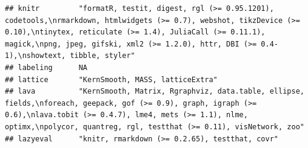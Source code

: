 \documentclass[]{article}
\begin{document}
\begin{verbatim}
## knitr         "formatR, testit, digest, rgl (>= 0.95.1201), codetools,\nrmarkdown, htmlwidgets (>= 0.7), webshot, tikzDevice (>= 0.10),\ntinytex, reticulate (>= 1.4), JuliaCall (>= 0.11.1), magick,\npng, jpeg, gifski, xml2 (>= 1.2.0), httr, DBI (>= 0.4-1),\nshowtext, tibble, styler"                                                                                                                                                                                                                                                                                                             
## labeling      NA                                                                                                                                                                                                                                                                                                                                                                                                                                                                                                                                                                                        
## lattice       "KernSmooth, MASS, latticeExtra"                                                                                                                                                                                                                                                                                                                                                                                                                                                                                                                                                          
## lava          "KernSmooth, Matrix, Rgraphviz, data.table, ellipse, fields,\nforeach, geepack, gof (>= 0.9), graph, igraph (>= 0.6),\nlava.tobit (>= 0.4.7), lme4, mets (>= 1.1), nlme, optimx,\npolycor, quantreg, rgl, testthat (>= 0.11), visNetwork, zoo"                                                                                                                                                                                                                                                                                                                                            
## lazyeval      "knitr, rmarkdown (>= 0.2.65), testthat, covr"                                                                                                                                                                                                                                                                                                                                                                                                                                                                                                                                            

\end{verbatim}
\end{document}
